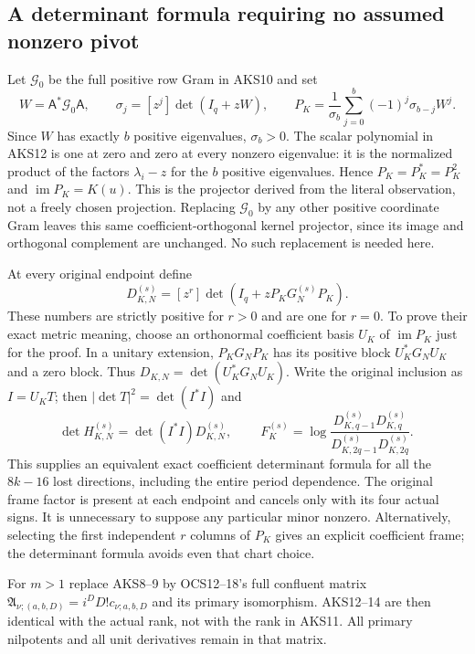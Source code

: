 \documentclass[11pt,a4paper]{article}
\begin{document}
\subsection{A determinant formula requiring no assumed nonzero pivot}
Let $\mathcal G_0$ be the full positive row Gram in AKS10 and set
\[
 W=\mathsf A^*\mathcal G_0\mathsf A,\qquad
 \sigma_j=[z^j]\det(I_q+zW),\qquad
 P_K=\frac1{\sigma_b}\sum_{j=0}^b(-1)^j\sigma_{b-j}W^j.
 \tag{AKS12}
\]
Since $W$ has exactly $b$ positive eigenvalues, $\sigma_b>0$. The scalar
polynomial in AKS12 is one at zero and zero at every nonzero eigenvalue:
it is the normalized product of the factors $\lambda_i-z$ for the $b$
positive eigenvalues. Hence $P_K=P_K^*=P_K^2$ and
$\operatorname{im}P_K=K(u)$. This is the projector derived from the
literal observation, not a freely chosen projection. Replacing
$\mathcal G_0$ by any other positive coordinate Gram leaves this same
coefficient-orthogonal kernel projector, since its image and orthogonal
complement are unchanged. No such replacement is needed here.

At every original endpoint define
\[
 D_{K,N}^{(s)}=[z^r]\det(I_q+zP_KG_N^{(s)}P_K).
 \tag{AKS13}
\]
These numbers are strictly positive for $r>0$ and are one for $r=0$.
To prove their exact metric meaning, choose an orthonormal coefficient
basis $U_K$ of $\operatorname{im}P_K$ just for the proof. In a unitary
extension, $P_KG_NP_K$ has its positive block $U_K^*G_NU_K$ and a zero
block. Thus $D_{K,N}=\det(U_K^*G_NU_K)$. Write the original inclusion
as $I=U_KT$; then $|\det T|^2=\det(I^*I)$ and
\[
 \det H_{K,N}^{(s)}=\det(I^*I)D_{K,N}^{(s)},\qquad
 \boxed{\ F_K^{(s)}=
 \log\frac{D_{K,q-1}^{(s)}D_{K,q}^{(s)}}
               {D_{K,2q-1}^{(s)}D_{K,2q}^{(s)}}.\ }
 \tag{AKS14}
\]
This supplies an equivalent exact coefficient determinant formula for
all the $8k-16$ lost directions, including the entire period dependence.
The original frame factor is present at each endpoint and cancels only
with its four actual signs. It is unnecessary to suppose any particular
minor nonzero. Alternatively, selecting the first independent $r$ columns
of $P_K$ gives an explicit coefficient frame; the determinant formula
avoids even that chart choice.

For $m>1$ replace AKS8--9 by OCS12--18's full confluent matrix
$\mathfrak A_{\nu;(a,b,D)}=i^DD!c_{\nu;a,b,D}$ and its primary isomorphism.
AKS12--14 are then identical with the actual rank, not with the rank in
AKS11. All primary nilpotents and all unit derivatives remain in that
matrix.
\end{document}
